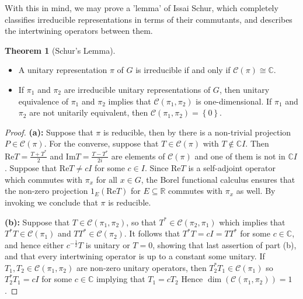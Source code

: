\documentclass[10pt,twoside,openany,final]{memoir}
\theoremstyle{definition}
\newtheorem{theorem}{Theorem}[chapter]
\theoremstyle{Break}
\newcommand{\R}{\mathbb{R}}
\newcommand{\C}{\mathbb{C}}
\renewcommand{\Re}{\mathrm{Re}}
\renewcommand{\Im}{\mathrm{Im}}
\begin{document}
With this in mind, we may prove a 'lemma' of Issai Schur, which completely classifies irreducible representations in terms of their commutants, and describes the intertwining operators between them.
\begin{theorem}[Schur's Lemma]
	\mbox{}
\begin{itemize}
\item A unitary representation $\pi$ of $G$ is irreducible if and only if $\mathcal{C}(\pi)\cong \C$.
\item If $\pi_1$ and $\pi_2$ are irreducible unitary representations of $G$, then unitary equivalence of $\pi_1$ and $\pi_2$ implies that $\mathcal{C}(\pi_1,\pi_2)$ is one-dimensional. If $\pi_1$ and $\pi_2$ are not unitarily equivalent, then $\mathcal{C}(\pi_1,\pi_2)=\left\{ 0 \right\}$.
\end{itemize}
\label{Schurs}
\end{theorem}
\begin{proof}
\textbf{(a):} Suppose that $\pi$ is reducible, then by  there is a non-trivial projection $P \in \mathcal{C}(\pi)$. For the converse, suppose that $T \in \mathcal{C}(\pi)$ with $T \not\in \C I$. Then $\Re T = \frac{T+T^*}{2}$ and $\Im T = \frac{T-T^*}{2i}$ are elements of $\mathcal{C}(\pi)$ and one of them is not in $\C I$. Suppose that $\Re T \neq c I$ for some $c \in I$. Since $\Re T$ is a self-adjoint operator which commutes with $\pi_x$ for all $x \in G$, the Borel functional calculus ensures that the non-zero projection $1_{E}(\Re T)$ for $E \subseteq \R$ commutes with $\pi_x$ as well. By invoking  we conclude that $\pi$ is reducible.

\textbf{(b):} Suppose that $T \in \mathcal{C}(\pi_1,\pi_2)$, so that $T^*\in \mathcal{C}(\pi_2,\pi_1)$ which implies that $T^*T \in \mathcal{C}(\pi_1)$ and $TT^*\in \mathcal{C}(\pi_2)$. It follows that $T^*T=cI=TT^*$ for some $c \in \C$, and hence either $c^{-\frac{1}{2}}T$ is unitary or $T=0$, showing that last assertion of part (b), and that every intertwining operator is up to a constant some unitary. If $T_1,T_2 \in \mathcal{C}(\pi_1,\pi_2)$ are non-zero unitary operators, then $T_2^*T_1 \in \mathcal{C}(\pi_1)$ so $T_2^*T_1 = c I$ for some $c \in \C$ implying that $ T_1=cT_2$ Hence $\dim(\mathcal{C}(\pi_1,\pi_2))=1$.
\end{proof}
\end{document}
